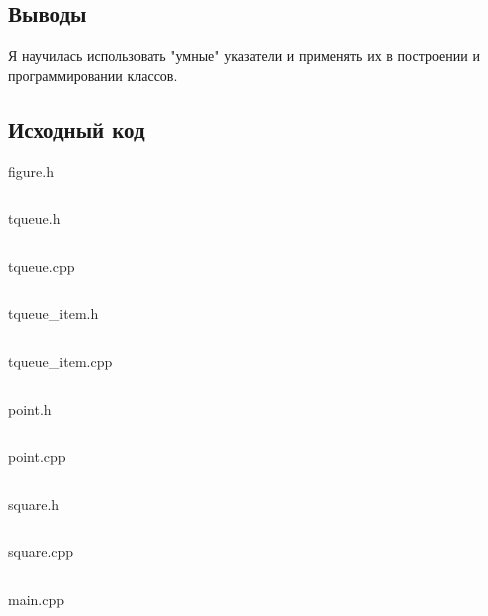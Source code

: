 \documentclass[12pt]{article}
\begin{document}
\subsection*{Выводы}

Я научилась использовать "умные" указатели и применять их в построении и программировании классов.
\pagebreak

\subsection*{Исходный код}

{\Huge figure.h}
\inputminted{C++}{tqueue.h}
\pagebreak

{\Huge tqueue.h}
\inputminted{C++}{tqueue.h}
\pagebreak

{\Huge tqueue.cpp}
\inputminted{C++}{tqueue.cpp}
\pagebreak

{\Huge tqueue\_item.h}
\inputminted{C++}{tqueueitem.h}
\pagebreak

{\Huge tqueue\_item.cpp}
\inputminted{C++}{tqueueitem.cpp}
\pagebreak
    
{\Huge point.h}
\inputminted{C++}{point.h}
    \pagebreak

{\Huge point.cpp}
\inputminted{C++}{point.cpp}
    \pagebreak

{\Huge square.h}
\inputminted{C++}{square.h}
\pagebreak

{\Huge square.cpp}
\inputminted{C++}{square.cpp}
\pagebreak
    
{\Huge main.cpp}
\inputminted{C++}{main.cpp}
    \pagebreak
    
\end{document}
